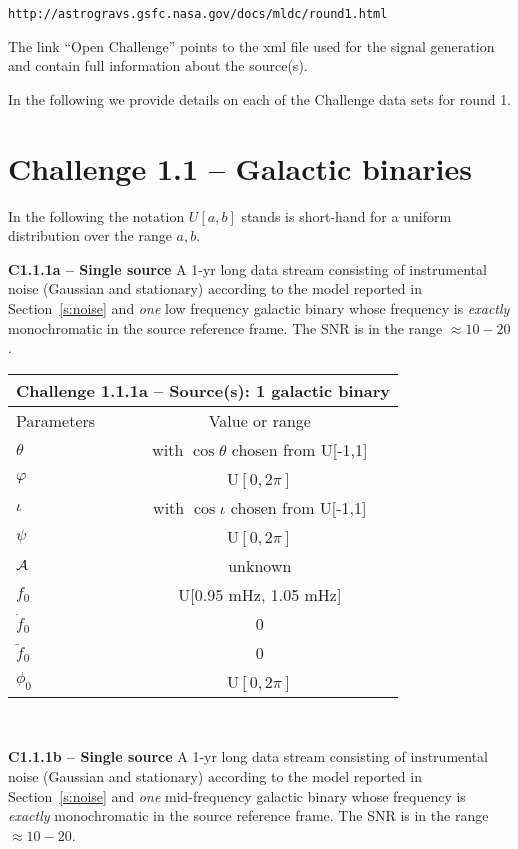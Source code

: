 \documentclass[11pt]{report}
\begin{document}
{\tt http://astrogravs.gsfc.nasa.gov/docs/mldc/round1.html}

The link ``Open Challenge'' points to the xml file used for the signal generation and contain full information about the source(s).

In the following we provide details on each of the Challenge data sets for round 1.


\section{Challenge 1.1 -- Galactic binaries}

In the following the notation $U[a,b]$ stands is short-hand for a uniform distribution over the range $a,b$.


\begin{description}

\item {\bf C1.1.1a -- Single source} A 1-yr long data stream consisting of instrumental noise (Gaussian and stationary) according to the model reported in Section~\ref{s:noise} and {\em one} low frequency galactic binary whose frequency is {\em exactly} monochromatic in the source reference frame. The SNR is in the range $\approx 10-20$. 

\begin{center}
\begin{tabular}{l|c}
\hline \hline
\multicolumn{2}{c}{{\bf Challenge 1.1.1a -- Source(s): 1 galactic binary}} \\
\hline
Parameters & Value or range \\
\hline
$\theta$          & with $\cos\theta$ chosen from U[-1,1]\\
$\varphi$         & U$[0,2\pi]$ \\ 
$\iota$           & with $\cos\iota$ chosen from U[-1,1]\\ 
$\psi$            & U$[0,2\pi]$ \\
${\cal A}$        & unknown \\
$f_0$             & U[0.95 mHz, 1.05 mHz] \\ 
$\dot{f}_0$       & 0 \\ 
$\ddot{f}_0$      & 0\\ 
$\phi_0$          & U$[0,2\pi]$ \\
\hline \hline
\end{tabular} \\
\end{center}


\item {\bf C1.1.1b -- Single source} A 1-yr long data stream consisting of instrumental noise (Gaussian and stationary) according to the model reported in Section~\ref{s:noise} and {\em one} mid-frequency galactic binary whose frequency is {\em exactly} monochromatic in the source reference frame. The SNR is in the range $\approx 10-20$. 


\end{description}
\end{document}
